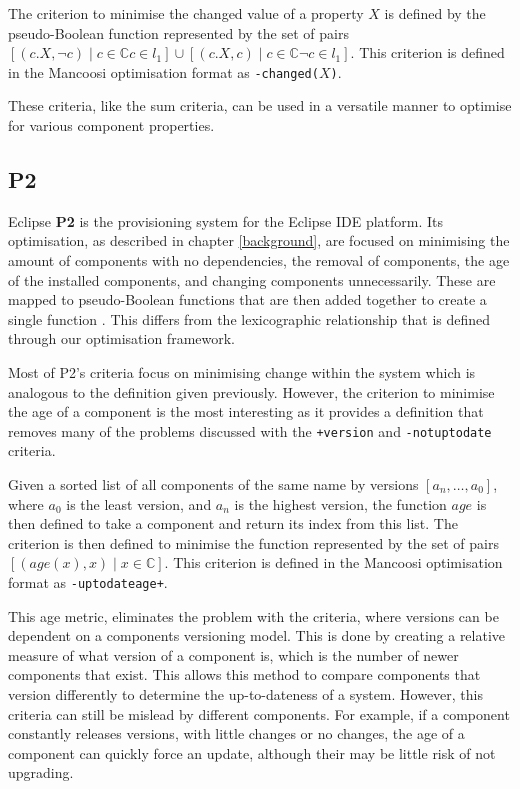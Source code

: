 \begin{defs}
The criterion to minimise the changed value of a property $X$ is defined by the pseudo-Boolean function 
represented by the set of pairs $[(c.X,\neg c) \mid c \in \mathbb{C} c \in l_1] \cup [(c.X,c) \mid c \in \mathbb{C} \neg c \in l_1]$.
This criterion is defined in the Mancoosi optimisation format as \verb!-changed(!$X$\verb+)+.
\end{defs}

These criteria, like the sum criteria, can be used in a versatile manner to optimise for various component properties.

\subsection{P2}
Eclipse \textbf{P2} \cite{le_berre_dependency_2009,leBerre2010} is the provisioning system for the Eclipse IDE platform.
Its optimisation, as described in chapter \ref{background}, are focused on minimising the amount of components with no dependencies, the removal of components,
the age of the installed components, and changing components unnecessarily.
These are mapped to pseudo-Boolean functions that are then added together to create a single function \citep{leBerre2010}.
This differs from the lexicographic relationship that is defined through our optimisation framework.

Most of P2's criteria focus on minimising change within the system which is analogous to the definition given previously.
However, the criterion to minimise the age of a component is the most interesting as it provides a definition that removes many of the problems
discussed with the  \verb!+version! and \verb+-notuptodate+ criteria.

\begin{defs}
Given a sorted list of all components of the same name by versions $[a_n,\ldots,a_0]$, where $a_0$ is the least version, and $a_n$ is the highest version,
the function $age$ is then defined to take a component and return its index from this list.
The criterion is then defined to minimise the function represented by the set of pairs $[(age(x), x) \mid x \in \mathbb{C}]$.
This criterion is defined in the Mancoosi optimisation format as \verb!-uptodateage+!.
\end{defs}

This age metric, eliminates the problem with the criteria, where versions can be dependent on a components versioning model.
This is done by creating a relative measure of what version of a component is, which is the number of newer components that exist.
This allows this method to compare components that version differently to determine the up-to-dateness of a system.
However, this criteria can still be mislead by different components.
For example, if a component constantly releases versions, with little changes or no changes, the age of a component can quickly force an update, 
although their may be little risk of not upgrading. 


